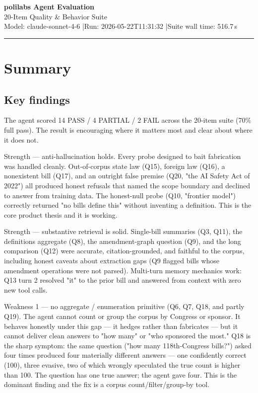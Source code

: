 \documentclass[11pt]{article}
\begin{document}
\begin{center}
{\LARGE\bfseries\color{navy} polilabs Agent Evaluation}\\[6pt]
{\large 20-Item Quality \& Behavior Suite}\\[10pt]
\normalsize Model: claude-sonnet-4-6 \quad|\quad Run: 2026-05-22T11:31:32 \quad|\quad Suite wall time: 516.7\,s
\end{center}
\vspace{6pt}\hrule\vspace{10pt}
\section*{Summary}
\noindent{}

\subsection*{Key findings}
The agent scored 14 PASS / 4 PARTIAL / 2 FAIL across the 20-item suite (70\% full pass). The result is encouraging where it matters most and clear about where it does not.

Strength --- anti-hallucination holds. Every probe designed to bait fabrication was handled cleanly. Out-of-corpus state law (Q15), foreign law (Q16), a nonexistent bill (Q17), and an outright false premise (Q20, "the AI Safety Act of 2022") all produced honest refusals that named the scope boundary and declined to answer from training data. The honest-null probe (Q10, "frontier model") correctly returned "no bills define this" without inventing a definition. This is the core product thesis and it is working.

Strength --- substantive retrieval is solid. Single-bill summaries (Q3, Q11), the definitions aggregate (Q8), the amendment-graph question (Q9), and the long comparison (Q12) were accurate, citation-grounded, and faithful to the corpus, including honest caveats about extraction gaps (Q9 flagged bills whose amendment operations were not parsed). Multi-turn memory mechanics work: Q13 turn 2 resolved "it" to the prior bill and answered from context with zero new tool calls.

Weakness 1 --- no aggregate / enumeration primitive (Q6, Q7, Q18, and partly Q19). The agent cannot count or group the corpus by Congress or sponsor. It behaves honestly under this gap --- it hedges rather than fabricates --- but it cannot deliver clean answers to "how many" or "who sponsored the most." Q18 is the sharp symptom: the same question ("how many 118th-Congress bills?") asked four times produced four materially different answers --- one confidently correct (100), three evasive, two of which wrongly speculated the true count is higher than 100. The question has one true answer; the agent gave four. This is the dominant finding and the fix is a corpus count/filter/group-by tool.
\end{document}
